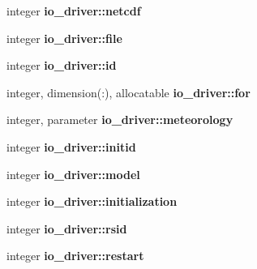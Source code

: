 \begin{DoxyCompactItemize}
\item 
\hypertarget{namespaceio__driver_a09e9ea074aea92dde6c9e5132ca71d08}{}integer {\bfseries io\+\_\+driver\+::netcdf}\label{namespaceio__driver_a09e9ea074aea92dde6c9e5132ca71d08}

\item 
\hypertarget{namespaceio__driver_ac194268935610899e2ea862568b327de}{}integer {\bfseries io\+\_\+driver\+::file}\label{namespaceio__driver_ac194268935610899e2ea862568b327de}

\item 
\hypertarget{namespaceio__driver_a3a0f67989999b05fd0effa0f2aebd60b}{}integer {\bfseries io\+\_\+driver\+::id}\label{namespaceio__driver_a3a0f67989999b05fd0effa0f2aebd60b}

\item 
\hypertarget{namespaceio__driver_ae16c5c088c4fdf79957d194536ebd3f0}{}integer, dimension(\+:), allocatable {\bfseries io\+\_\+driver\+::for}\label{namespaceio__driver_ae16c5c088c4fdf79957d194536ebd3f0}

\item 
\hypertarget{namespaceio__driver_abebf1e79e82df65405dc2a0347a8b7aa}{}integer, parameter {\bfseries io\+\_\+driver\+::meteorology}\label{namespaceio__driver_abebf1e79e82df65405dc2a0347a8b7aa}

\item 
\hypertarget{namespaceio__driver_a9e2b67e7bc840d6141a51d7c3bac5d2f}{}integer {\bfseries io\+\_\+driver\+::initid}\label{namespaceio__driver_a9e2b67e7bc840d6141a51d7c3bac5d2f}

\item 
\hypertarget{namespaceio__driver_a7a3d41ae917d287c6f6cfc11d3ecd8fd}{}integer {\bfseries io\+\_\+driver\+::model}\label{namespaceio__driver_a7a3d41ae917d287c6f6cfc11d3ecd8fd}

\item 
\hypertarget{namespaceio__driver_ace2d9268780f10e85ca253f2bb77ec18}{}integer {\bfseries io\+\_\+driver\+::initialization}\label{namespaceio__driver_ace2d9268780f10e85ca253f2bb77ec18}

\item 
\hypertarget{namespaceio__driver_a63ffe8d89b62a1ac8a58c840e86426c9}{}integer {\bfseries io\+\_\+driver\+::rsid}\label{namespaceio__driver_a63ffe8d89b62a1ac8a58c840e86426c9}

\item 
\hypertarget{namespaceio__driver_a33088b1824e92707659e7cff21e5fda8}{}integer {\bfseries io\+\_\+driver\+::restart}\label{namespaceio__driver_a33088b1824e92707659e7cff21e5fda8}


\end{DoxyCompactItemize}
